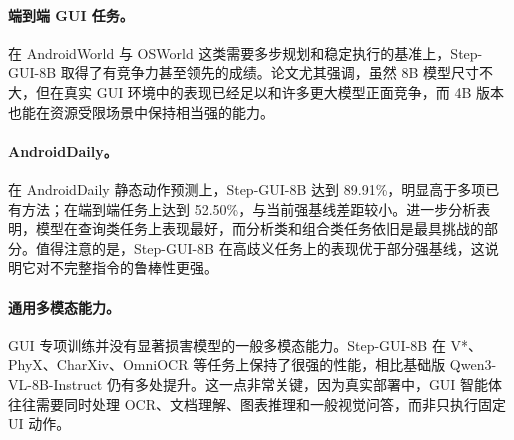 \begin{table}[t]
\centering
\caption{多个 GUI grounding 基准上的表现。粗体为最优，带下划线为次优。}
\label{tab:gui_benchmark_performance}
\end{table}

\paragraph{端到端 GUI 任务。}
在 AndroidWorld 与 OSWorld 这类需要多步规划和稳定执行的基准上，Step-GUI-8B 取得了有竞争力甚至领先的成绩。论文尤其强调，虽然 8B 模型尺寸不大，但在真实 GUI 环境中的表现已经足以和许多更大模型正面竞争，而 4B 版本也能在资源受限场景中保持相当强的能力。

\paragraph{AndroidDaily。}
在 AndroidDaily 静态动作预测上，Step-GUI-8B 达到 89.91\%，明显高于多项已有方法；在端到端任务上达到 52.50\%，与当前强基线差距较小。进一步分析表明，模型在查询类任务上表现最好，而分析类和组合类任务依旧是最具挑战的部分。值得注意的是，Step-GUI-8B 在高歧义任务上的表现优于部分强基线，这说明它对不完整指令的鲁棒性更强。

\paragraph{通用多模态能力。}
GUI 专项训练并没有显著损害模型的一般多模态能力。Step-GUI-8B 在 V*、PhyX、CharXiv、OmniOCR 等任务上保持了很强的性能，相比基础版 Qwen3-VL-8B-Instruct 仍有多处提升。这一点非常关键，因为真实部署中，GUI 智能体往往需要同时处理 OCR、文档理解、图表推理和一般视觉问答，而非只执行固定 UI 动作。

